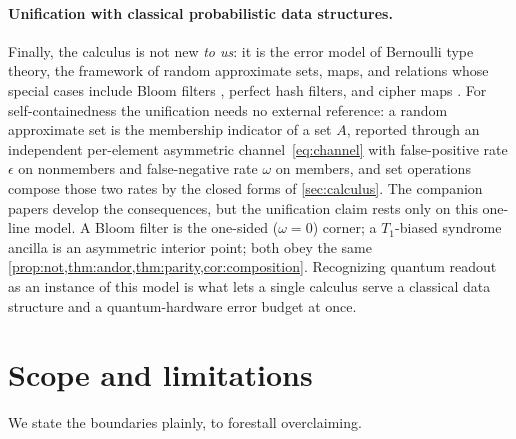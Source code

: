 \documentclass[a4paper,onecolumn,unpublished,nopdfoutputerror,allowtoday]{quantumarticle}
\numberwithin{equation}{section}
\theoremstyle{plain}
\theoremstyle{definition}
\theoremstyle{remark}
\newcommand{\eps}{\epsilon}
\begin{document}
\paragraph{Unification with classical probabilistic data structures.}
Finally, the calculus is not new \emph{to us}: it is the error model of Bernoulli
type theory, the framework of random approximate sets, maps, and relations whose
special cases include Bloom filters \citep{bloom1970}, perfect hash filters, and
cipher maps \citep{bernoulliSets,bernoulliComposition,bernoulliMaps,bernoulliRelations}.
For self-containedness the unification needs no external reference: a random
approximate set is the membership indicator of a set $A$, reported through an
independent per-element asymmetric channel~\eqref{eq:channel} with false-positive
rate $\eps$ on nonmembers and false-negative rate $\omega$ on members, and set
operations compose those two rates by the closed forms of \cref{sec:calculus}. The
companion papers develop the consequences, but the unification claim rests only on
this one-line model.
A Bloom filter is the one-sided ($\omega=0$) corner; a $T_1$-biased syndrome
ancilla is an asymmetric interior point; both obey the same
\cref{prop:not,thm:andor,thm:parity,cor:composition}. Recognizing quantum readout
as an instance of this model is what lets a single calculus serve a classical
data structure and a quantum-hardware error budget at once.


\section{Scope and limitations}
\label{sec:scope}

We state the boundaries plainly, to forestall overclaiming.
\end{document}
